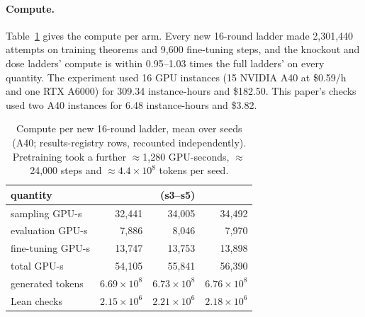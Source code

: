 \paragraph{Compute.} Table~\ref{tab:compute} gives the compute per arm. Every new 16-round ladder made 2,301,440 attempts
on training theorems and 9,600 fine-tuning steps, and the knockout and dose ladders' compute is within 0.95--1.03 times
the full ladders' on every quantity. The experiment used 16 GPU instances (15 NVIDIA A40 at \$0.59/h and one RTX A6000)
for 309.34 instance-hours and \$182.50. This paper's checks used two A40 instances for 6.48 instance-hours and \$3.82.

\begin{table}[h]
\centering\small
\caption{Compute per new 16-round ladder, mean over seeds (A40; results-registry rows, recounted independently).
Pretraining took a further $\approx$1,280 GPU-seconds, $\approx$24,000 steps and $\approx 4.4\times10^8$ tokens per
seed.}
\label{tab:compute}
\begin{tabular}{lrrr}
\toprule
quantity & \Kko{} & \Kfull{} (s3--s5) & \Kdose{} \\
\midrule
sampling GPU-s & 32,441 & 34,005 & 34,492 \\
evaluation GPU-s & 7,886 & 8,046 & 7,970 \\
fine-tuning GPU-s & 13,747 & 13,753 & 13,898 \\
total GPU-s & 54,105 & 55,841 & 56,390 \\
generated tokens & $6.69\times10^8$ & $6.73\times10^8$ & $6.76\times10^8$ \\
Lean checks & $2.15\times10^6$ & $2.21\times10^6$ & $2.18\times10^6$ \\
\bottomrule
\end{tabular}
\end{table}
